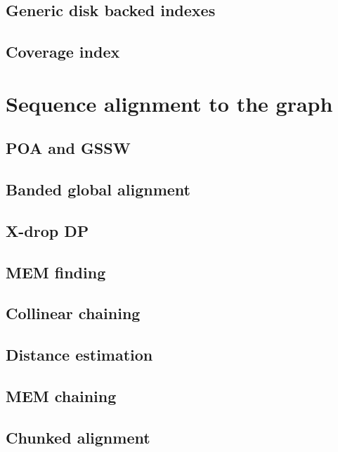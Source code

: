 \subsection{Generic disk backed indexes}

\subsection{Coverage index}


\section{Sequence alignment to the graph}

\subsection{POA and GSSW}

\subsection{Banded global alignment}

\subsection{X-drop DP}

\subsection{MEM finding}


\subsection{Collinear chaining}

\subsection{Distance estimation}

\subsection{MEM chaining}

\subsection{Chunked alignment}


